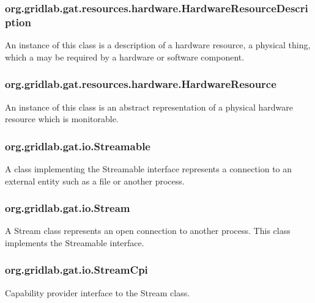 \documentclass[$Date: 2003/06/26 19:29:31 $]{glabarticle}
\begin{document}
\subsubsection{org.gridlab.gat.resources.hardware.HardwareResourceDescription}

An instance of this class is a description of a hardware resource, a
physical thing, which a may be required by a hardware or software
component.

\subsubsection{org.gridlab.gat.resources.hardware.HardwareResource}

An instance of this class is an abstract representation of a physical
hardware resource which is monitorable.

\subsubsection{org.gridlab.gat.io.Streamable}

A class implementing the Streamable interface represents a connection to an external entity 
such as a file or another process. 

\subsubsection{org.gridlab.gat.io.Stream}

A Stream class represents an open connection to another process. This class implements the Streamable interface.

\subsubsection{org.gridlab.gat.io.StreamCpi}

Capability provider interface to the Stream class.

\end{document}
